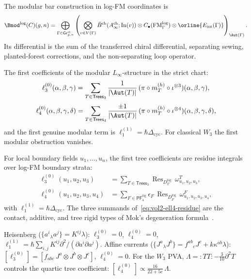 \begin{remark}
\label{rem:vol2-log-modular-bar-functor}
The modular bar construction in log-FM coordinates is
\[
\Bmod^{\log}(C)(g,n)
=
\bigoplus_{\Gamma\in \mathsf{Gr}^{\mathrm{st}}_{g,n}}
\left(
\bigotimes_{v\in V(\Gamma)} \bar B^{\mathrm{ch}}(A^{\mathrm{ch}}_\infty;\mathrm{In}(v))
\otimes
C_\bullet(\operatorname{FM}^{\log}_{\Gamma})
\otimes
\orline{E_{\mathrm{int}}(\Gamma)}
\right)_{\Aut(\Gamma)}.
\]
Its differential is the sum of the transferred chiral
differential, separating sewing, planted-forest corrections, and the
non-separating loop operator.
\end{remark}

\begin{computation}
\label{comp:vol2-low-genus-control}
The first coefficients of the modular $L_\infty$-structure in the strict chart:
\[
\ell_3^{(0)}(\alpha,\beta,\gamma)
=
\sum_{T\in\mathsf{Trees}_3}
\frac{1}{|\Aut(T)|}\,
(\pi\circ m_T^{(h)}\circ\iota^{\otimes 3})(\alpha,\beta,\gamma),
\]
\[
\ell_4^{(0)}(\alpha,\beta,\gamma,\delta)
=
\sum_{T\in\mathsf{Trees}_4}
\frac{\pm1}{|\Aut(T)|}\,
(\pi\circ m_T^{(h)}\circ\iota^{\otimes 4})(\alpha,\beta,\gamma,\delta),
\]
and the first genuine modular term is
$\ell_1^{(1)} = \hbar\Delta_{\mathrm{cyc}}$.
For classical $W_3$ the first modular obstruction vanishes.
\end{computation}

\begin{construction}
\label{const:vol2-pva-coordinate-graph-coefficients}
For local boundary fields $u_1,\dots,u_n$, the first tree
coefficients are residue integrals over log-FM boundary strata:
\begin{align}
\ell_3^{(0)}(u_1,u_2,u_3)
&=
\sum_{T\in \mathsf{Trees}_3}
\operatorname{Res}_{D_T^{\log}}\,\omega^{T}_{u_1,u_2,u_3},
\label{eq:vol2-ell3-residue}\\
\ell_4^{(0)}(u_1,u_2,u_3,u_4)
&=
\sum_{F\in \mathsf{PF}^{\mathrm{rig}}_4}
\epsilon_F\,\operatorname{Res}_{D_F^{\log}}\,\omega^{F}_{u_1,u_2,u_3,u_4},
\label{eq:vol2-ell4-residue}
\end{align}
with $\ell_1^{(1)}=\hbar\Delta_{\mathrm{cyc}}$.
The three summands of~\eqref{eq:vol2-ell4-residue} are the
contact, additive, and tree rigid types of Mok's degeneration
formula~\cite[Corollary~5.3.4]{Mok25}.
\end{construction}

\begin{computation}
\label{comp:vol2-archetype-formulas}
Heisenberg ($\{a^i{}_{\lambda}a^j\}=K^{ij}\lambda$):
$\ell_3^{(0)}=0$, $\ell_4^{(0)}=0$,
$\ell_1^{(1)}=\hbar\sum_{i,j}K^{ij}\partial^2/(\partial a^i\partial a^j)$.
Affine currents ($\{J^a{}_{\lambda}J^b\}=f^{ab}{}_cJ^c+k\kappa^{ab}\lambda$):
$[\ell_3^{(0)}]=[f_{abc}\,J^a\otimes J^b\otimes J^c]$,
$\ell_4^{(0)}=0$.
For the $W_3$ PVA, $\Lambda={:}TT{:}-\tfrac{3}{10}\partial^2T$
controls the quartic tree coefficient: $[\ell_4^{(0)}]\propto
\tfrac{16}{22+5c}\,\Lambda$.
\end{computation}

